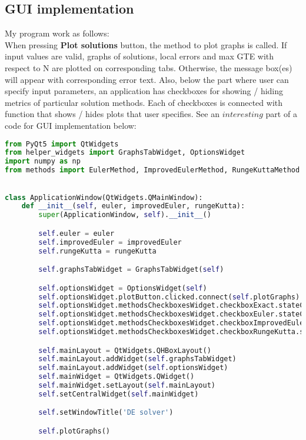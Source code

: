 \documentclass[12pt, a4paper]{article}
\begin{document}
    \subsection{GUI implementation}
    My program work as follows: \\ When pressing \textbf{Plot solutions} button, the method to plot graphs is called. If input values are valid, graphs of solutions, local errors and max GTE with respect to N are plotted on corresponding tabs. Otherwise, the message box(es) will appear with corresponding error text. Also, below the part where user can specify input parameters, an application has checkboxes for showing / hiding metrics of particular solution methods. Each of checkboxes is connected with function that shows / hides plots that user specifies. See an $interesting$ part of a code for GUI implementation below: 
    \\

    \begin{lstlisting}[language=Python, caption=\_\_init\_\_ method of ApplicationWindow class (Main window of GUI). GraphsTabWidget and OptionsWidget are composite widgets (also classes) for graphs and options setting correspondingly.]
from PyQt5 import QtWidgets
from helper_widgets import GraphsTabWidget, OptionsWidget
import numpy as np
from methods import EulerMethod, ImprovedEulerMethod, RungeKuttaMethod
    

class ApplicationWindow(QtWidgets.QMainWindow):
    def __init__(self, euler, improvedEuler, rungeKutta):
        super(ApplicationWindow, self).__init__()

        self.euler = euler
        self.improvedEuler = improvedEuler
        self.rungeKutta = rungeKutta

        self.graphsTabWidget = GraphsTabWidget(self)

        self.optionsWidget = OptionsWidget(self)
        self.optionsWidget.plotButton.clicked.connect(self.plotGraphs)
        self.optionsWidget.methodsCheckboxesWidget.checkboxExact.stateChanged.connect(self.plotGraphs)
        self.optionsWidget.methodsCheckboxesWidget.checkboxEuler.stateChanged.connect(self.plotGraphs)
        self.optionsWidget.methodsCheckboxesWidget.checkboxImprovedEuler.stateChanged.connect(self.plotGraphs)
        self.optionsWidget.methodsCheckboxesWidget.checkboxRungeKutta.stateChanged.connect(self.plotGraphs)

        self.mainLayout = QtWidgets.QHBoxLayout()
        self.mainLayout.addWidget(self.graphsTabWidget)
        self.mainLayout.addWidget(self.optionsWidget)
        self.mainWidget = QtWidgets.QWidget()
        self.mainWidget.setLayout(self.mainLayout)
        self.setCentralWidget(self.mainWidget)

        self.setWindowTitle('DE solver')

        self.plotGraphs()
    \end{lstlisting}
    
\end{document}
